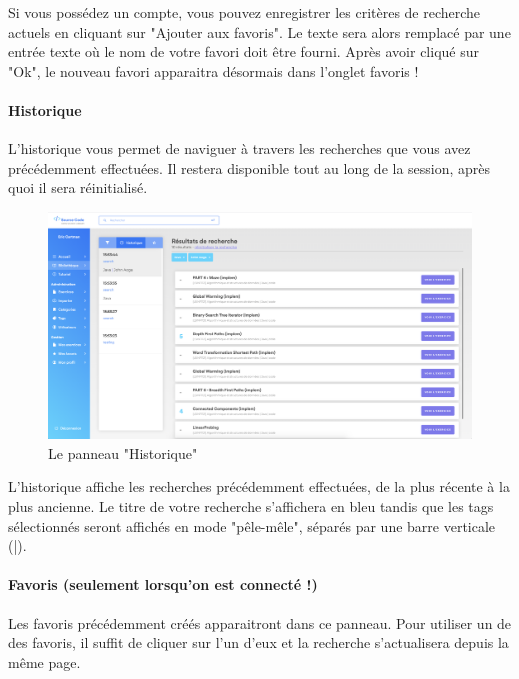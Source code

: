 Si vous possédez un compte, vous pouvez enregistrer les critères de recherche actuels en cliquant sur "Ajouter aux favoris". Le texte sera alors remplacé par une entrée texte où le nom de votre favori doit être fourni. Après avoir cliqué sur "Ok", le nouveau favori apparaitra désormais dans l'onglet favoris !\\


\paragraph{Historique} L'historique vous permet de naviguer à travers les recherches que vous avez précédemment effectuées. Il restera disponible tout au long de la session, après quoi il sera réinitialisé.\\

\begin{figure}[H]
    \includegraphics[width=\textwidth,height=\textheight,keepaspectratio]{images/client/historical.png}
    \centering
    \caption[SourceCode : le panneau "Historique"]{Le panneau "Historique"}
\end{figure}

L'historique affiche les recherches précédemment effectuées, de la plus récente à la plus ancienne. Le titre de votre recherche s'affichera en bleu tandis que les \glspl{tag} sélectionnés seront affichés en mode "pêle-mêle", séparés par une barre verticale (|).\\

\paragraph{Favoris (seulement lorsqu'on est connecté !)} Les favoris précédemment créés apparaitront dans ce panneau. Pour utiliser un de des favoris, il suffit de cliquer sur l'un d'eux et la recherche s'actualisera depuis la même page.

